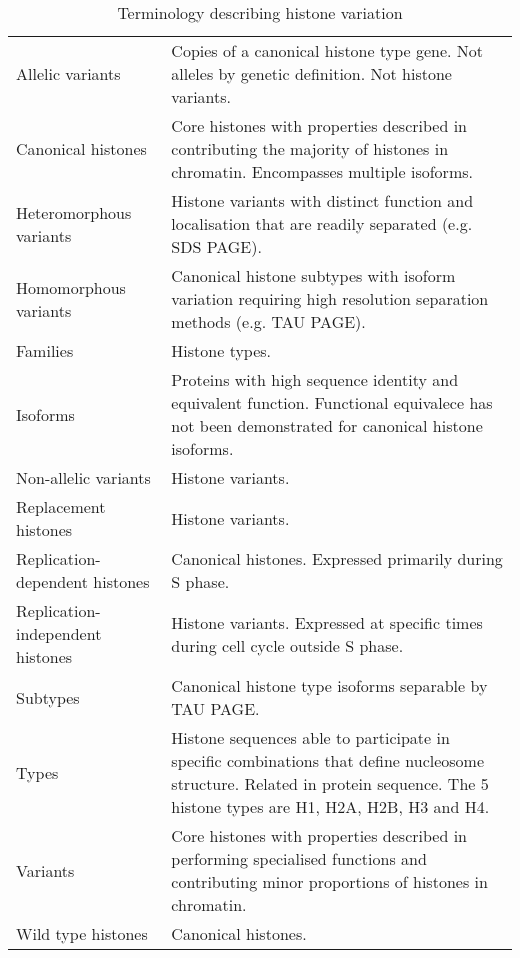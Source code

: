  \begin{table*}
    \caption{Terminology describing histone variation}
    \label{tab:histone-divisions}
    \centering
    \begin{tabular}{F p{\dimexpr(\textwidth--4\tabcolsep)}}
      \toprule
	  Allelic variants &
	  Copies of a canonical histone type gene. Not alleles by genetic definition. Not histone variants. 
	  \\
      \addlinespace
	  Canonical histones &
	  Core histones with properties described in  contributing the majority of histones in chromatin. 
	  Encompasses multiple isoforms.
	  \\
      \addlinespace
	  Heteromorphous variants &
	  Histone variants with distinct function and localisation that are readily separated (e.g. SDS PAGE).
	  \\
      \addlinespace
	  Homomorphous variants &
	  Canonical histone subtypes with isoform variation requiring high resolution separation methods (e.g. TAU PAGE).
	  \\
      \addlinespace
	  Families &
	  Histone types.
	  \\
      \addlinespace
	  Isoforms &
	  Proteins with high sequence identity and equivalent function. Functional equivalece has not been demonstrated for canonical histone isoforms.
	  \\
      \addlinespace
	  Non-allelic variants &
	  Histone variants. \\
      \addlinespace
      Replacement histones &
	  Histone variants. \\
      \addlinespace
	  Replication-dependent histones &
	  Canonical histones. Expressed primarily during S phase. \\
      \addlinespace
	  Replication-independent histones &
	  Histone variants. Expressed at specific times during cell cycle outside S phase. \\
      \addlinespace
	  Subtypes &
	  Canonical histone type isoforms separable by TAU PAGE. 
	  \\
      \addlinespace
	  Types &
	  Histone sequences able to participate in specific combinations that define nucleosome structure. Related in protein sequence.
	  The 5 histone types are H1, H2A, H2B, H3 and H4.
	  \\
      \addlinespace
	  Variants &
	  Core histones with properties described in  
	  performing specialised functions and contributing minor proportions of histones in chromatin. \\
      \addlinespace
	  Wild type histones &
	  Canonical histones. \\
      \bottomrule
    \end{tabular}
  \end{table*}

